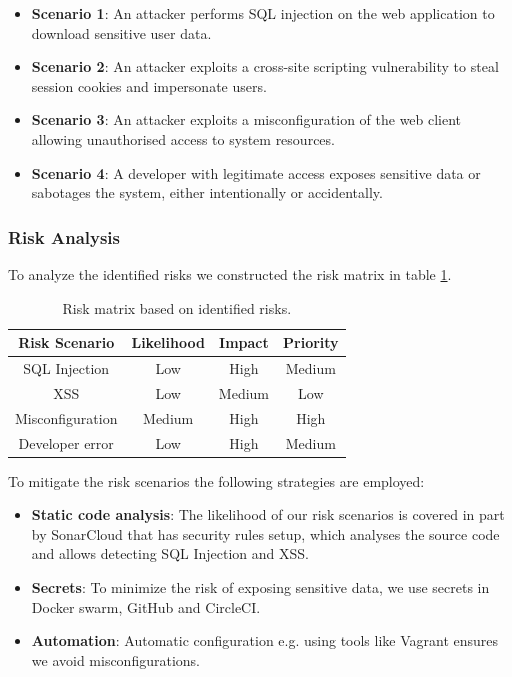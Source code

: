 \begin{multicols}{2}
    \begin{itemize}
        \item \textbf{Scenario 1}: An attacker performs SQL injection on the web application to download sensitive user data.
        \item \textbf{Scenario 2}: An attacker exploits a cross-site scripting vulnerability to steal session cookies and impersonate users.
        \item \textbf{Scenario 3}: An attacker exploits a misconfiguration of the web client allowing unauthorised access to system resources.
        \item \textbf{Scenario 4}: A developer with legitimate access exposes sensitive data or sabotages the system, either intentionally or accidentally.
    \end{itemize} 
\end{multicols}


\subsubsection*{Risk Analysis}
To analyze the identified risks we constructed the risk matrix in table \ref{tab:risk_matrix}.

\begin{table} [H]
    \centering
    \begin{tabular}{|c||c|c|c|}
        \hline
        Risk Scenario & Likelihood & Impact & Priority \\ \hline\hline
        SQL Injection & Low & High & Medium\\ \hline
        XSS & Low & Medium & Low \\ \hline 
        Misconfiguration & Medium & High & High \\ \hline 
        Developer error & Low & High & Medium \\ \hline
    \end{tabular}
    \caption{Risk matrix based on identified risks.}
    \label{tab:risk_matrix}
\end{table}

To mitigate the risk scenarios the following strategies are employed:
\begin{itemize}
    \item \textbf{Static code analysis}: The likelihood of our risk scenarios is covered in part by SonarCloud that has security rules setup, which analyses the source code and allows detecting SQL Injection and XSS. %
    \item \textbf{Secrets}: To minimize the risk of exposing sensitive data, we use secrets in Docker swarm, GitHub and CircleCI. 
    \item \textbf{Automation}: Automatic configuration e.g. using tools like Vagrant ensures we avoid misconfigurations.
\end{itemize}

